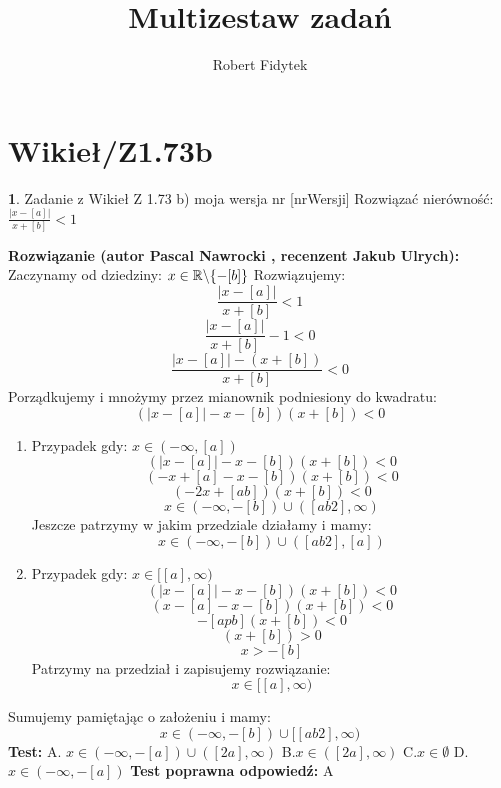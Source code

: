 \documentclass[12pt, a4paper]{article}
\title{Multizestaw zadań}
\author{Robert Fidytek}
\date{}
\theoremstyle{definition} %
\newtheorem{zad}{}
\newcommand{\kategoria}[1]{\section{#1}} %
\newcommand{\zadStart}[1]{\begin{zad}#1\newline} %
\newcommand{\zadStop}{\end{zad}}   %
\newcommand{\rozwStart}[2]{\noindent \textbf{Rozwiązanie (autor #1 , recenzent #2): }\newline} %
\newcommand{\odpStop}{\newline}                                             %
\newcommand{\testStart}{\noindent \textbf{Test:}\newline} %
\newcommand{\testStop}{\newline} %
\newcommand{\kluczStart}{\noindent \textbf{Test poprawna odpowiedź:}\newline} %
\newcommand{\kluczStop}{\newline} %
\begin{document}
\maketitle


\kategoria{Wikieł/Z1.73b}
\zadStart{Zadanie z Wikieł Z 1.73 b) moja wersja nr [nrWersji]}
Rozwiązać nierówność: $\frac{|x-[a]|}{x+[b]}<1$
\zadStop
\rozwStart{Pascal Nawrocki}{Jakub Ulrych}
Zaczynamy od dziedziny: $x\in\mathbb{R}\symbol{92}\{-[b]\}$
Rozwiązujemy:
$$\frac{|x-[a]|}{x+[b]}<1$$
$$\frac{|x-[a]|}{x+[b]}-1<0$$
$$\frac{|x-[a]|-(x+[b])}{x+[b]}<0$$
Porządkujemy i mnożymy przez mianownik podniesiony do kwadratu:
$$(|x-[a]|-x-[b])(x+[b])<0$$
\begin{enumerate}
\item Przypadek gdy: $x\in(-\infty,[a])$
$$(|x-[a]|-x-[b])(x+[b])<0$$
$$(-x+[a]-x-[b])(x+[b])<0$$
$$(-2x+[ab])(x+[b])<0$$
$$x\in(-\infty,-[b])\cup([ab2],\infty)$$
Jeszcze patrzymy w jakim przedziale działamy i mamy:
$$x\in(-\infty,-[b])\cup([ab2],[a])$$
\item Przypadek gdy: $x\in[[a],\infty)$
$$(|x-[a]|-x-[b])(x+[b])<0$$
$$(x-[a]-x-[b])(x+[b])<0$$
$$-[apb](x+[b])<0$$
$$(x+[b])>0$$
$$x>-[b]$$
Patrzymy na przedział i zapisujemy rozwiązanie:
$$x\in[[a],\infty)$$
\end{enumerate}
Sumujemy pamiętając o założeniu i mamy:
$$x\in(-\infty,-[b])\cup[[ab2],\infty)$$
\odpStop
\testStart
A. $x\in(-\infty,-[a])\cup([2a],\infty)$
B.$x\in([2a],\infty)$
C.$x\in\emptyset$
D.$x\in(-\infty,-[a])$
\testStop
\kluczStart
A
\kluczStop
\end{document}
